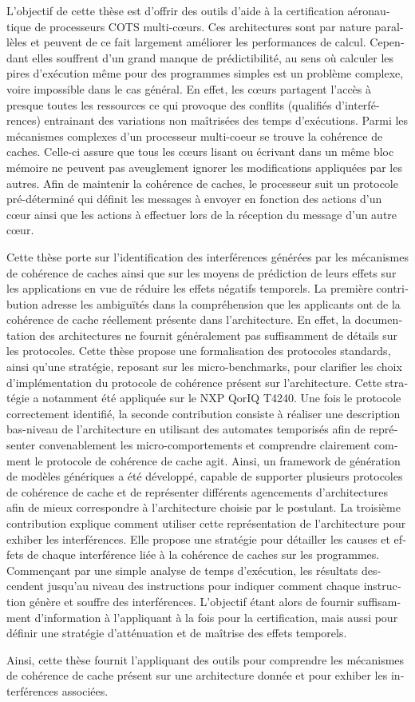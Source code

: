 \begin{otherlanguage}{french}
L'objectif de cette thèse est d'offrir des outils d'aide à la certification
aéronautique de processeurs COTS multi-cœurs. Ces architectures sont par nature
parallèles et peuvent de ce fait largement améliorer les performances de
calcul. Cependant elles souffrent d'un grand manque de prédictibilité, au sens
où calculer les pires d'exécution même pour des programmes simples est un
problème complexe, voire impossible dans le cas général. En effet, les cœurs
partagent l'accès à presque toutes les ressources ce qui provoque des conflits
(qualifiés d'interférences) entrainant des variations non maîtrisées des temps
d'exécutions.  Parmi les mécanismes complexes d'un processeur multi-coeur se
trouve la cohérence de caches. Celle-ci assure que tous les cœurs lisant ou
écrivant dans un même bloc mémoire ne peuvent pas aveuglement ignorer les
modifications appliquées par les autres.  Afin de maintenir la cohérence de
caches, le processeur suit un protocole pré-déterminé qui définit les messages
à envoyer en fonction des actions d'un cœur ainsi que les actions à effectuer
lors de la réception du message d'un autre cœur.

Cette thèse porte sur l'identification des interférences générées par les
mécanismes de cohérence de caches ainsi que sur les moyens de prédiction de
leurs effets sur les applications en vue de réduire les effets négatifs
temporels.  La première contribution adresse les ambiguïtés dans la
compréhension que les applicants ont de la cohérence de cache réellement
présente dans l'architecture.  En effet, la documentation des architectures ne
fournit généralement pas suffisamment de détails sur les protocoles.  Cette
thèse propose une formalisation des protocoles standards, ainsi qu'une
stratégie, reposant sur les micro-benchmarks, pour clarifier les choix
d'implémentation du protocole de cohérence présent sur l'architecture. Cette
stratégie a notamment été appliquée sur le NXP QorIQ T4240. Une fois le
protocole correctement identifié, la seconde contribution consiste à réaliser
une description bas-niveau de l'architecture en utilisant des automates
temporisés afin de représenter convenablement les micro-comportements et
comprendre clairement comment le protocole de cohérence de cache agit. Ainsi,
un framework de génération de modèles génériques a été développé, capable de
supporter plusieurs protocoles de cohérence de cache et de représenter
différents agencements d'architectures afin de mieux correspondre à
l'architecture choisie par le postulant. La troisième contribution explique
comment utiliser cette représentation de l'architecture pour exhiber les
interférences. Elle propose une stratégie pour détailler les causes et effets
de chaque interférence liée à la cohérence de caches sur les programmes.
Commençant par une simple analyse de temps d'exécution, les résultats
descendent jusqu'au niveau des instructions pour indiquer comment chaque
instruction génère et souffre des interférences. L'objectif étant alors de
fournir suffisamment d'information à l'appliquant à la fois pour la
certification, mais aussi pour définir une stratégie d'atténuation et de
maîtrise des effets temporels.

Ainsi, cette thèse fournit l'appliquant des outils pour comprendre les
mécanismes de cohérence de cache présent sur une architecture donnée et pour
exhiber les interférences associées.
\end{otherlanguage}
